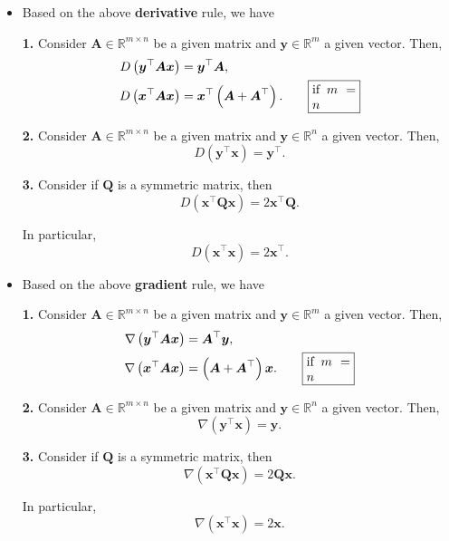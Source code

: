 \documentclass[12pt,thmsa]{article}
\begin{document}
\begin{itemize}
	\item Based on the above \textbf{derivative} rule, we have

	\textbf{1.} Consider \(\boldsymbol{A} \in \mathbb{R}^{m \times n}\) be a given matrix and \(\boldsymbol{y} \in \mathbb{R}^{m}\) a given vector. Then,
	\begin{align*}
		D\left(\boldsymbol{y}^{\top} \boldsymbol{A} \boldsymbol{x}\right) &=
		\boldsymbol{y}^{\top} \boldsymbol{A}, \\
		D\left(\boldsymbol{x}^{\top} \boldsymbol{A} \boldsymbol{x}\right) &=
		\boldsymbol{x}^{\top}\left(\boldsymbol{A}+\boldsymbol{A}^{\top}\right).  \qquad
		\fbox{\parbox{0.1\textwidth}{ if \(m=n\) }}
	\end{align*}
	
	
	\textbf{2.} Consider \(\boldsymbol{A} \in \mathbb{R}^{m \times n}\) be a given matrix and \(\boldsymbol{y} \in \mathbb{R}^{n}\) a given vector. Then,
	\[ D\left(\boldsymbol{y}^{\top} \boldsymbol{x}\right)=\boldsymbol{y}^{\top}. \]
	
	\textbf{3.} Consider if \(\boldsymbol{Q}\) is a symmetric matrix, then
	\[
	D\left(\boldsymbol{x}^{\top} \boldsymbol{Q} \boldsymbol{x}\right)=2 \boldsymbol{x}^{\top} \boldsymbol{Q}.
	\]
	
	In particular,
	\[
	D\left(\boldsymbol{x}^{\top} \boldsymbol{x}\right)=2 \boldsymbol{x}^{\top}.
	\]

	\item Based on the above \textbf{gradient} rule, we have

	\textbf{1.} Consider \(\boldsymbol{A} \in \mathbb{R}^{m \times n}\) be a given matrix and \(\boldsymbol{y} \in \mathbb{R}^{m}\) a given vector. Then,
	\begin{align*}
		\nabla \left(\boldsymbol{y}^{\top} \boldsymbol{A} \boldsymbol{x}\right) &= \boldsymbol{A}^{\top} \boldsymbol{y}, \\
		\nabla  \left(\boldsymbol{x}^{\top} \boldsymbol{A} \boldsymbol{x}\right) &=
		\left(\boldsymbol{A}+\boldsymbol{A}^{\top}\right) \boldsymbol{x}.  \qquad
		\fbox{\parbox{0.1\textwidth}{ if \(m=n\) }}
	\end{align*}
	
	
	\textbf{2.} Consider \(\boldsymbol{A} \in \mathbb{R}^{m \times n}\) be a given matrix and \(\boldsymbol{y} \in \mathbb{R}^{n}\) a given vector. Then,
	\[ \nabla \left(\boldsymbol{y}^{\top} \boldsymbol{x}\right)=\boldsymbol{y}. \]
	
	\textbf{3.} Consider if \(\boldsymbol{Q}\) is a symmetric matrix, then
	\[
	\nabla \left(\boldsymbol{x}^{\top} \boldsymbol{Q} \boldsymbol{x}\right)=2  \boldsymbol{Q} \boldsymbol{x}.
	\]
	
	In particular,
	\[
	\nabla \left(\boldsymbol{x}^{\top} \boldsymbol{x}\right)=2 \boldsymbol{x}.
	\]

\end{itemize}
\end{document}
